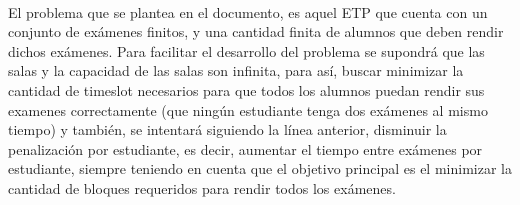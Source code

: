\documentclass[letter, 10pt]{article}
\begin{document}
\begin{itemize}
\end{itemize}
\\
El problema que se plantea en
 el documento, es aquel ETP que cuenta con un conjunto de exámenes finitos, y una cantidad finita de alumnos que deben rendir dichos exámenes. Para facilitar el desarrollo del problema se supondrá que las salas y la capacidad de las salas son infinita, para así, buscar minimizar la cantidad de timeslot necesarios para que todos los alumnos puedan rendir sus examenes correctamente (que ningún estudiante tenga dos exámenes al mismo tiempo) y también, se intentará siguiendo la línea anterior, disminuir la penalización por estudiante, es decir, aumentar el tiempo entre exámenes por estudiante, siempre teniendo en cuenta que el objetivo principal es el minimizar la cantidad de bloques requeridos para rendir todos los exámenes.
\end{document}

